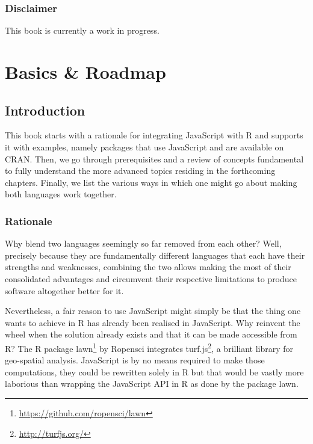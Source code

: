 \documentclass[
]{krantz}
\renewcommand{\href}[2]{#2\footnote{\url{#1}}}
\begin{document}
\hypertarget{disclaimer}{%
\section*{Disclaimer}\label{disclaimer}}


This book is currently a work in progress.

\mainmatter

\hypertarget{part-basics-roadmap}{%
\part{Basics \& Roadmap}\label{part-basics-roadmap}}

\hypertarget{introduction}{%
\chapter{Introduction}\label{introduction}}

This book starts with a rationale for integrating JavaScript with R and supports it with examples, namely packages that use JavaScript and are available on CRAN. Then, we go through prerequisites and a review of concepts fundamental to fully understand the more advanced topics residing in the forthcoming chapters. Finally, we list the various ways in which one might go about making both languages work together.

\hypertarget{rationale}{%
\section*{Rationale}\label{rationale}}


Why blend two languages seemingly so far removed from each other? Well, precisely because they are fundamentally different languages that each have their strengths and weaknesses, combining the two allows making the most of their consolidated advantages and circumvent their respective limitations to produce software altogether better for it.

Nevertheless, a fair reason to use JavaScript might simply be that the thing one wants to achieve in R has already been realised in JavaScript. Why reinvent the wheel when the solution already exists and that it can be made accessible from R? The R package \href{https://github.com/ropensci/lawn}{lawn} \citep{R-lawn} by Ropensci integrates \href{http://turfjs.org/}{turf.js}, a brilliant library for geo-spatial analysis. JavaScript is by no means required to make those computations, they could be rewritten solely in R but that would be vastly more laborious than wrapping the JavaScript API in R as done by the package lawn.
\end{document}
